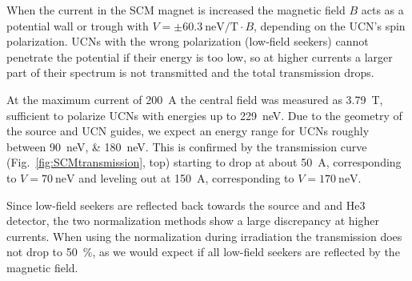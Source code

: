 \documentclass[10pt,letterpaper]{article}
\begin{document}
When the current in the SCM magnet is increased the magnetic field $B$ acts as a potential wall or trough with $V = \pm \SI{60.3}{\nano\electronvolt\per\tesla} \cdot B$, depending on the UCN's spin polarization. UCNs with the wrong polarization (low-field seekers) cannot penetrate the potential if their energy is too low, so at higher currents a larger part of their spectrum is not transmitted and the total transmission drops.

At the maximum current of \SI{200}{\ampere} the central field was measured as \SI{3.79}{\tesla}, sufficient to polarize UCNs with energies up to \SI{229}{\nano\electronvolt}. Due to the geometry of the source and UCN guides, we expect an energy range for UCNs roughly between \SIlist{90;180}{\nano\electronvolt}. This is confirmed by the transmission curve (Fig.~\ref{fig:SCMtransmission}, top) starting to drop at about \SI{50}{\ampere}, corresponding to $V = \SI{70}{\nano\electronvolt}$ and leveling out at \SI{150}{\ampere}, corresponding to $V = \SI{170}{\nano\electronvolt}$.

Since low-field seekers are reflected back towards the source and and He3 detector, the two normalization methods show a large discrepancy at higher currents. When using the normalization during irradiation the transmission does not drop to \SI{50}{\percent}, as we would expect if all low-field seekers are reflected by the magnetic field.
\end{document}
